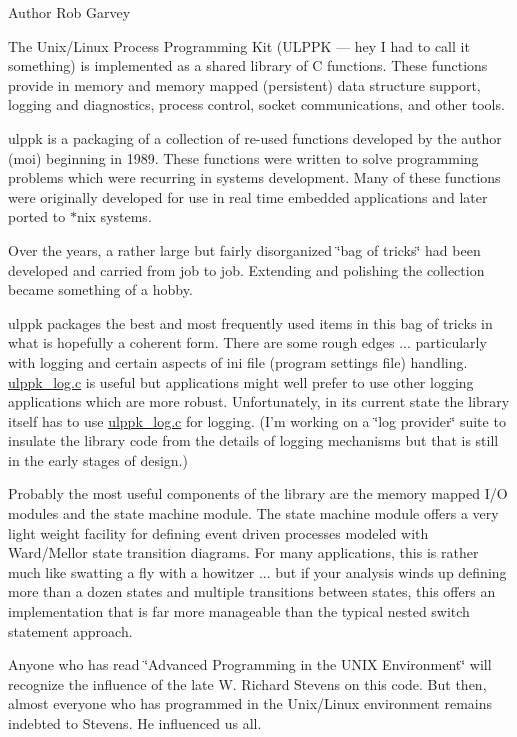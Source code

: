 \begin{DoxyAuthor}{Author}
Rob Garvey
\end{DoxyAuthor}
The Unix/\-Linux Process Programming Kit (U\-L\-P\-P\-K --- hey I had to call it something) is implemented as a shared library of C functions. These functions provide in memory and memory mapped (persistent) data structure support, logging and diagnostics, process control, socket communications, and other tools.

ulppk is a packaging of a collection of re-\/used functions developed by the author (moi) beginning in 1989. These functions were written to solve programming problems which were recurring in systems development. Many of these functions were originally developed for use in real time embedded applications and later ported to $\ast$nix systems.

Over the years, a rather large but fairly disorganized \char`\"{}bag of tricks\char`\"{} had been developed and carried from job to job. Extending and polishing the collection became something of a hobby.

ulppk packages the best and most frequently used items in this bag of tricks in what is hopefully a coherent form. There are some rough edges ... particularly with logging and certain aspects of ini file (program settings file) handling. \hyperlink{ulppk__log_8c}{ulppk\-\_\-log.\-c} is useful but applications might well prefer to use other logging applications which are more robust. Unfortunately, in its current state the library itself has to use \hyperlink{ulppk__log_8c}{ulppk\-\_\-log.\-c} for logging. (I'm working on a \char`\"{}log provider\char`\"{} suite to insulate the library code from the details of logging mechanisms but that is still in the early stages of design.)

Probably the most useful components of the library are the memory mapped I/\-O modules and the state machine module. The state machine module offers a very light weight facility for defining event driven processes modeled with Ward/\-Mellor state transition diagrams. For many applications, this is rather much like swatting a fly with a howitzer ... but if your analysis winds up defining more than a dozen states and multiple transitions between states, this offers an implementation that is far more manageable than the typical nested switch statement approach.

Anyone who has read \char`\"{}\-Advanced Programming in the U\-N\-I\-X Environment\char`\"{} will recognize the influence of the late W. Richard Stevens on this code. But then, almost everyone who has programmed in the Unix/\-Linux environment remains indebted to Stevens. He influenced us all.


